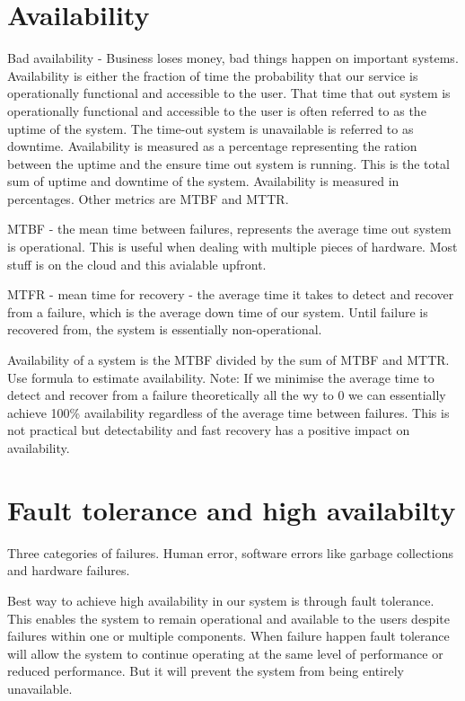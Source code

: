 \documentclass[a4paper, 11pt]{book}
\begin{document}
    \section{Availability}
    Bad availability - Business loses money, bad things happen on important systems.
    Availability is either the fraction of time the probability that our service is operationally functional and accessible to the user.
    That time that out system is operationally functional and accessible to the user is often referred to as the uptime of the system.
    The time-out system is unavailable is referred to as downtime.
    Availability is measured as a percentage representing the ration between the uptime and the ensure time out system is running.
    This is the total sum of uptime and downtime of the system.
    Availability is measured in percentages.
    Other metrics are MTBF and MTTR.

    MTBF - the mean time between failures, represents the average time out system is operational.
    This is useful when dealing with multiple pieces of hardware. Most stuff is on the cloud and this avialable upfront.

    MTFR - mean time for recovery - the average time it takes to detect and recover from a failure, which is the average down time of our system.
    Until failure is recovered from, the system is essentially non-operational.

    Availability of a system is the MTBF divided by the sum of MTBF and MTTR.
    Use formula to estimate availability.
    Note: If we minimise the average time to detect and recover from a failure theoretically all the wy to 0 we can essentially achieve 100\%
    availability regardless of the average time between failures.
    This is not practical but detectability and fast recovery has a positive impact on availability.


    \section{Fault tolerance and high availabilty}
    Three categories of failures.
    Human error, software errors like garbage collections and hardware failures.

    Best way to achieve high availability in our system is through fault tolerance.
    This enables the system to remain operational and available to the users despite failures within one or multiple components.
    When failure happen fault tolerance will allow the system to continue operating at the same level of performance or reduced performance.
    But it will prevent the system from being entirely unavailable.
\end{document}
